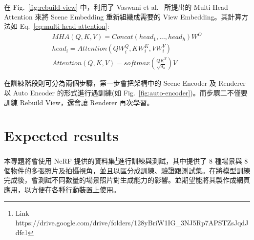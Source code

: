 \documentclass[10pt,twocolumn,letterpaper]{article}
\begin{document}
\begin{CJK}{UTF8}{bkai}
   在 Fig.~\ref{fig:rebuild-view} 中，利用了 Vaswani et al.~\cite{AttentionIsAllYouNeed} 所提出的
   Multi Head Attention 來將 Scene Embedding 重新組織成需要的 View Embedding。其計算方法如 Eq.~\ref{eq:multi-head-attention}:
   \begin{equation}
      \begin{aligned}
         MHA(Q, K, V) = Concat(head_{1},...,head_{h})W^{O}      \\
         head_{i} = Attention(QW^{Q}_{i},KW^{K}_{i},VW^{V}_{i}) \\
         Attention(Q, K, V ) = softmax(\frac{QK^{T}}{\sqrt{d_{k}}})V
      \end{aligned}
      \label{eq:multi-head-attention}
   \end{equation}

   在訓練階段則可分為兩個步驟，第一步會把架構中的 Scene Encoder 及 Renderer 以 Auto Encoder 的形式進行遇訓練(如
   Fig.~\ref{fig:auto-encoder})。而步驟二不僅要訓練 Rebuild View，還會讓 Renderer 再次學習。

   \section{Expected results}
   本專題將會使用 NeRF 提供的資料集\footnote{Link https://drive.google.com/drive/folders/128yBriW1IG\_3NJ5Rp7APSTZsJqdJdfc1}進行訓練與測試，其中提供了
   8 種場景與 8 個物件的多張照片及拍攝視角，並且以區分成訓練、驗證跟測試集。在將模型訓練完成後，會測試不同數量的場景照片對生成能力的影響。並期望能將其製作成網頁應用，以方便在各種行動裝置上使用。

   {\small
   
   
   }
\end{CJK}
\end{document}
